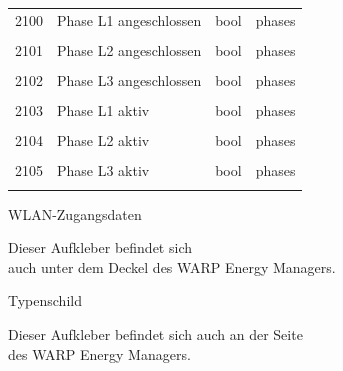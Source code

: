 \documentclass[a4paper,10pt]{article}
\newcommand{\tdesc}[1]{\multicolumn{3}{l}{\footnotesize #1}}
\begin{document}
\begin{tabularx}{\textwidth}{rXll}
2100          & Phase L1 angeschlossen                  & bool         & phases                                                 \\
              & \tdesc{}                                                                                                        \\ \cmidrule{2-4}
2101          & Phase L2 angeschlossen                  & bool         & phases                                                 \\
              & \tdesc{}                                                                                                        \\ \cmidrule{2-4}
2102          & Phase L3 angeschlossen                  & bool         & phases                                                 \\
              & \tdesc{}                                                                                                        \\ \cmidrule{2-4}
2103          & Phase L1 aktiv                          & bool         & phases                                                 \\
              & \tdesc{}                                                                                                        \\ \cmidrule{2-4}
2104          & Phase L2 aktiv                          & bool         & phases                                                 \\
              & \tdesc{}                                                                                                        \\ \cmidrule{2-4}
2105          & Phase L3 aktiv                          & bool         & phases                                                 \\
              & \tdesc{}                                                                                                        \\ \bottomrule
   \end{tabularx}
	\begin{multicols*}{2}




	\newpage
	\pagestyle{empty}
	\null
	\vfill
	WLAN-Zugangsdaten
	\begin{tcolorbox}[width=4.2cm,height=2.7cm, boxrule=0.25mm]

	\end{tcolorbox}
	Dieser Aufkleber befindet sich\\ auch unter dem Deckel des WARP Energy
	Managers.
	\columnbreak

	\null
	\vfill
	Typenschild
	\begin{tcolorbox}[width=7.8cm,height=4.1cm, boxrule=0.25mm]

	\end{tcolorbox}
	Dieser Aufkleber befindet sich auch an der Seite\\ des WARP Energy Managers.
\end{multicols*}
\end{document}
